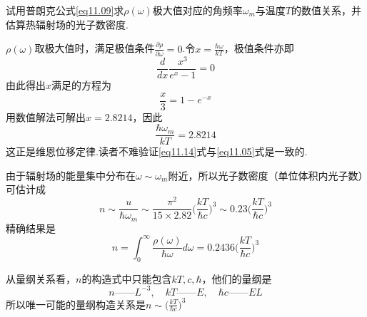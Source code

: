 \example 试用普朗克公式\eqref{eq11.09}求$\rho(\omega)$极大值对应的角频率$\omega_{m}$与温度$T$的数值关系，并估算热辐射场的光子数密度.

\solution $\rho(\omega)$取极大值时，满足极值条件$\frac{\partial \rho}{\partial \omega}=0$.令$x=\frac{\hbar\omega}{kT}$，极值条件亦即
\eqshort
\begin{equation*}
	\frac{d}{dx}\frac{x^{3}}{e^{x}-1}=0
\end{equation*}
由此得出$x$满足的方程为
\begin{equation*}
	\frac{x}{3}=1-e^{-x}
\end{equation*}
用数值解法可解出$x=\num{2.8214}$，因此
\begin{equation}\label{eq11.14}
	\frac{\hbar\omega_{m}}{kT}=\num{2.8214}
\end{equation}\eqnormal
这正是维恩位移定律.读者不难验证\eqref{eq11.14}式与\eqref{eq11.05}式是一致的.

由于辐射场的能量集中分布在$\omega\sim\omega_{m}$附近，所以光子数密度（单位体积内光子数）可估计成
\begin{equation}\label{eq11.15}
	n\sim\frac{u}{\hbar\omega_{m}}\sim\frac{\pi^{2}}{15\times2.82}\bigl(\frac{kT}{\hbar c}\bigr)^{3}\sim 0.23\bigl(\frac{kT}{\hbar c}\bigr)^{3}
\end{equation}
精确结果是
\begin{equation}\label{eq11.16}
	n=\int_{0}^{\infty}\frac{\rho(\omega)}{\hbar\omega}d\omega=0.2436\bigl(\frac{kT}{\hbar c}\bigr)^{3}
\end{equation}

从量纲关系看，$n$的构造式中只能包含$kT,c,\hbar$，他们的量纲是
\begin{equation*}
	n——\si{L^{-3}},\quad kT—— \si{E},\quad \hbar c—— \si{EL} 
\end{equation*}
所以唯一可能的量纲构造关系是$n\sim\bigl( \frac{kT}{\hbar c} \bigr)^{3}$







